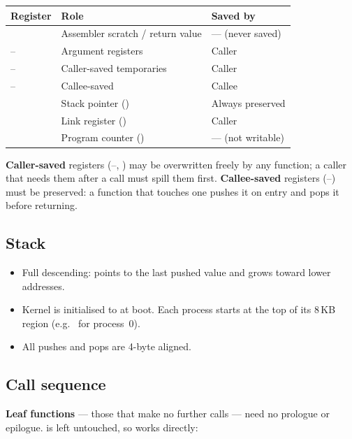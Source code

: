 \documentclass[11pt]{article}
\begin{document}
\begin{center}
\begin{tabular}{@{}L{2.4cm} L{6.8cm} L{3.4cm}@{}}
\toprule
\textbf{Register} & \textbf{Role} & \textbf{Saved by} \\
\midrule
{}         & Assembler scratch / return value & --- (never saved) \\
-- & Argument registers & Caller \\
-- & Caller-saved temporaries & Caller \\
-- & Callee-saved & Callee \\
        & Stack pointer () & Always preserved \\
        & Link register () & Caller \\
        & Program counter () & --- (not writable) \\
\bottomrule
\end{tabular}
\end{center}

\textbf{Caller-saved} registers (--, ) may be
overwritten freely by any function; a caller that needs them after a call must
spill them first. \textbf{Callee-saved} registers (--) must be
preserved: a function that touches one pushes it on entry and pops it before
returning.

\subsection{Stack}
\begin{itemize}[leftmargin=1.4em]
  \item Full descending:  points to the last pushed value and grows
        toward lower addresses.
  \item Kernel  is initialised to  at boot. Each process  starts at the top of its 8\,KB region (e.g.\  for process~0).
  \item All pushes and pops are 4-byte aligned.
\end{itemize}

\subsection{Call sequence}

\textbf{Leaf functions} --- those that make no further calls --- need no prologue
or epilogue.  is left untouched, so  works directly:
\end{document}

